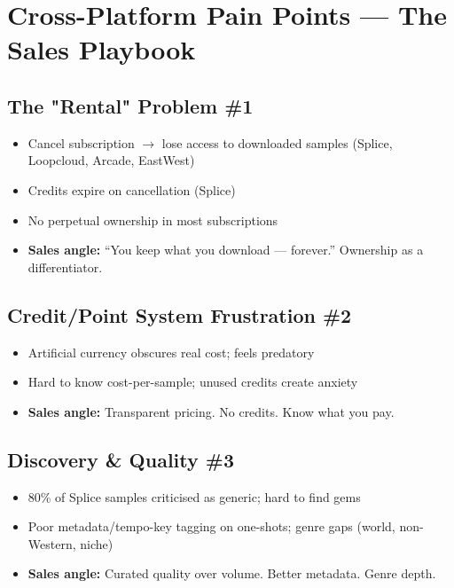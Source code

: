 \documentclass[11pt,a4paper]{article}
\begin{document}

\section{Cross-Platform Pain Points — The Sales Playbook}

\subsection{The "Rental" Problem \#1}
\begin{itemize}
  \item Cancel subscription $\rightarrow$ lose access to downloaded samples (Splice, Loopcloud, Arcade, EastWest)
  \item Credits expire on cancellation (Splice)
  \item No perpetual ownership in most subscriptions
  \item \textbf{Sales angle:} ``You keep what you download — forever.'' Ownership as a differentiator.
\end{itemize}

\subsection{Credit/Point System Frustration \#2}
\begin{itemize}
  \item Artificial currency obscures real cost; feels predatory
  \item Hard to know cost-per-sample; unused credits create anxiety
  \item \textbf{Sales angle:} Transparent pricing. No credits. Know what you pay.
\end{itemize}

\subsection{Discovery \& Quality \#3}
\begin{itemize}
  \item 80\% of Splice samples criticised as generic; hard to find gems
  \item Poor metadata/tempo-key tagging on one-shots; genre gaps (world, non-Western, niche)
  \item \textbf{Sales angle:} Curated quality over volume. Better metadata. Genre depth.
\end{itemize}
\end{document}
